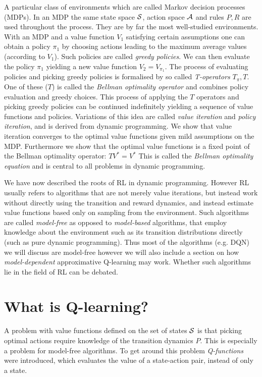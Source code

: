 A particular class of environments which are called Markov decision processes
(MDPs).
In an MDP the same state space $\mathcal{S}$, action space $\mathcal{A}$ and rules
$P, R$ are used throughout the process.
They are by far the most well-studied environments.
With an MDP and a value function $V_1$ satisfying certain assumptions 
one can obtain a policy $\pi_1$ by choosing actions
leading to the maximum average values (according to $V_1$).
Such policies are called \emph{greedy policies}.
We can then evaluate the policy $\pi_1$
yielding a new value function $V_2 = V_{\pi_1}$.
The process of evaluating policies and picking greedy policies
is formalised by so called \emph{T-operators} $T_\pi, T$.
One of these ($T$) is called the \emph{Bellman optimality operator}
and combines policy evaluation and greedy choices.
This process of applying the $T$ operators and picking greedy policies
can be continued indefinitely yielding a sequence of value
functions and policies.
Variations of this idea are called \emph{value iteration} and
\emph{policy iteration},
and is derived from dynamic programming.
We show that value iteration converges to the optimal value functions
given mild assumptions on the MDP.
Furthermore we show that the optimal value functions is a fixed point
of the Bellman optimality operator: $TV^* = V^*$
This is called the \emph{Bellman optimality equation} and
is central to all problems in dynamic programming.

We have now described the roots of RL in dynamic programming.
However RL usually refers to algorithms that
are not merely value iterations, but instead work without
directly using the transition and reward dynamics,
and instead estimate value functions based only on sampling from the
environment.
Such algorithms are called \emph{model-free} as opposed to
\emph{model-based} algorithms, that employ knowledge about the
environment such as its transition distributions directly
(such as pure dynamic programming).
Thus most of the algorithms (e.g. DQN) we will discuss are model-free
however we will also include a section on how \emph{model-dependent}
approximative Q-learning may work. Whether such algorithms lie in the
field of RL can be debated.

\section{What is Q-learning?}

A problem with value functions defined on the set of states $\mathcal{S}$ is that
picking optimal actions require knowledge of the transition dynamics $P$.
This is especially a problem for model-free algorithms.
To get around this problem \emph{Q-functions} were introduced, which evaluates
the value of a state-action pair, instead of only a state.

